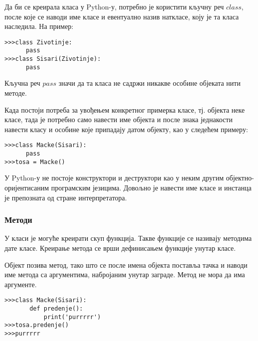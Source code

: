 Да би се креирала класа у Python-у, потребно је користити кључну реч $class$, после које се наводи име класе и евентуално назив наткласе, коју је та класа наследила. На пример:

\begin{lstlisting}[caption=Дефинисање класа, label=class]
>>>class Zivotinje:
      pass
>>>class Sisari(Zivotinje):
      pass
\end{lstlisting}

Кључна реч $pass$ значи да та класа не садржи никакве особине објеката нити методе.

Када постоји потреба за увођењем конкретног примерка класе, тј. објекта неке класе, тада је потребно само навести име објекта и после знака једнакости навести класу и особине које припадају датом објекту, као у следећем примеру:

\begin{lstlisting}[caption=Креирање објекта, label=objects]
>>>class Macke(Sisari):
      pass
>>>tosa = Macke()
\end{lstlisting}

У Python-у не постоје конструктори и деструктори као у неким другим објектно- оријентисаним програмским језицима. Довољно је навести име класе и инстанца је препозната од стране интерпретатора.

\subsubsection{Методи}

У класи је могуће креирати скуп функција. Такве функције се називају методима дате класе. Креирање метода се врши дефинисањем функције унутар класе.

Објект позива метод, тако што се после имена објекта поставља тачка и наводи име метода са аргументима, набројаним унутар заграде. Метод не мора да има аргументе.

\begin{lstlisting}[caption= Методи класе, label=method]
>>>class Macke(Sisari):
       def predenje():
           print('purrrrr')
>>>tosa.predenje()
>>>purrrrr
\end{lstlisting}
